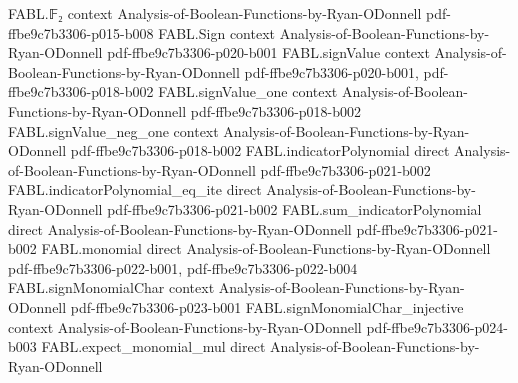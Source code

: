 \begin{theorem}
\label{FABL.relativeHammingDist_queriedFiniteFamilyFourierEstimatorOutput_le_of_no_bad}
\leanok
{}
\proofstep
  {FABL.𝔽₂}
  {context}
  {Analysis-of-Boolean-Functions-by-Ryan-ODonnell}
  {pdf-ffbe9c7b3306-p015-b008}
\proofstep
  {FABL.Sign}
  {context}
  {Analysis-of-Boolean-Functions-by-Ryan-ODonnell}
  {pdf-ffbe9c7b3306-p020-b001}
\proofstep
  {FABL.signValue}
  {context}
  {Analysis-of-Boolean-Functions-by-Ryan-ODonnell}
  {pdf-ffbe9c7b3306-p020-b001,
    pdf-ffbe9c7b3306-p018-b002}
\proofstep
  {FABL.signValue_one}
  {context}
  {Analysis-of-Boolean-Functions-by-Ryan-ODonnell}
  {pdf-ffbe9c7b3306-p018-b002}
\proofstep
  {FABL.signValue_neg_one}
  {context}
  {Analysis-of-Boolean-Functions-by-Ryan-ODonnell}
  {pdf-ffbe9c7b3306-p018-b002}
\proofstep
  {FABL.indicatorPolynomial}
  {direct}
  {Analysis-of-Boolean-Functions-by-Ryan-ODonnell}
  {pdf-ffbe9c7b3306-p021-b002}
\proofstep
  {FABL.indicatorPolynomial_eq_ite}
  {direct}
  {Analysis-of-Boolean-Functions-by-Ryan-ODonnell}
  {pdf-ffbe9c7b3306-p021-b002}
\proofstep
  {FABL.sum_indicatorPolynomial}
  {direct}
  {Analysis-of-Boolean-Functions-by-Ryan-ODonnell}
  {pdf-ffbe9c7b3306-p021-b002}
\proofstep
  {FABL.monomial}
  {direct}
  {Analysis-of-Boolean-Functions-by-Ryan-ODonnell}
  {pdf-ffbe9c7b3306-p022-b001,
    pdf-ffbe9c7b3306-p022-b004}
\proofstep
  {FABL.signMonomialChar}
  {context}
  {Analysis-of-Boolean-Functions-by-Ryan-ODonnell}
  {pdf-ffbe9c7b3306-p023-b001}
\proofstep
  {FABL.signMonomialChar_injective}
  {context}
  {Analysis-of-Boolean-Functions-by-Ryan-ODonnell}
  {pdf-ffbe9c7b3306-p024-b003}
\proofstep
  {FABL.expect_monomial_mul}
  {direct}
  {Analysis-of-Boolean-Functions-by-Ryan-ODonnell}

\end{theorem}
